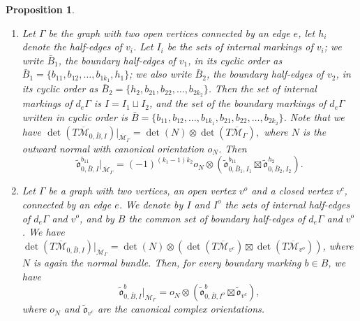 \documentclass[11pt,a4paper]{article}
\newtheorem{prop}[dummy]{Proposition}
\theoremstyle{definition}
\theoremstyle{remark}
\numberwithin{equation}{section}
\def\Mbar{{\overline{\mathcal M}}}
\begin{document}
\begin{prop}
\begin{enumerate}
  
        
        \item Let $\Gamma$ be the graph with two open vertices connected by an edge $e$, let $h_i$ denote the half-edges of $v_i$. Let $I_i$ be the sets of internal markings of $v_i$; we write $\bar{B}_1$, the boundary half-edges of $v_1$, in its cyclic order as $\bar{B}_1=\{b_{11},b_{12},\dots,b_{1k_1},h_1\}$; we also write $\bar{B}_2$, the boundary half-edges of $v_2$, in its cyclic order as $\bar{B}_2=\{h_2,b_{21},b_{22},\dots,b_{2k_2}\}$. Then the set of internal markings of $d_e \Gamma$ is $I=I_1\sqcup I_2$, and the set of the boundary markings of $d_e \Gamma$ written in cyclic order is $\bar{B}=\{b_{11},b_{12},\dots,b_{1k_1},b_{21},b_{22},\dots,b_{2k_2}\}$. Note that we have $\det(T\Mbar_{0,\bar{B},I})\big|_{\Mbar_\Gamma} = \det(N)\otimes \det( T\Mbar_{\Gamma}),$ where $N$ is the outward normal with canonical orientation $o_N$. Then
        \begin{equation}\label{eq orientation moduli open open}
        \tilde{\mathfrak{o}}^{b_{11}}_{0,\bar B,I}\big |_{\Mbar_\Gamma^{}}=(-1)^{(k_1-1)k_2}o_N\otimes
         \left(\tilde{\mathfrak{o}}^{b_{11}}_{0,\bar B_1,I_1}\boxtimes\tilde{\mathfrak{o}}^{h_2}_{0,\bar B_2,I_2}\right).
         \end{equation}

        \item

        Let $\Gamma$ be a graph with two vertices, an open vertex $v^o$ and a closed vertex $v^c$, connected by an edge $e$.  We denote by $I$ and $I^o$ the sets of internal half-edges of $d_e\Gamma$ and $v^o$, and by $B$ the common set of boundary half-edges of $d_e\Gamma$ and $v^o$. We have $\det(T\Mbar_{0,\bar{B},I})\big|_{\Mbar_\Gamma} = \det(N)\otimes \left(\det(T\Mbar_{v^c})\boxtimes \det(T\Mbar_{v^o})\right)$, where $N$ is again the normal bundle.  Then, for every boundary marking $b\in B$, we have
        \begin{equation}\label{eq orientation moduli closed open}
        \tilde{\mathfrak{o}}^b_{0,\bar B,I}|_{\Mbar_\Gamma} = o_N\otimes (\tilde{\mathfrak{o}}^b_{0,\bar B,I^o}\boxtimes \tilde{\mathfrak{o}}_{v^c}),
        \end{equation}
        where $o_N$ and $\tilde{\mathfrak{o}}_{v^c}$ are the canonical complex orientations.
        
   

 

 \end{enumerate}
\end{prop}
\end{document}

